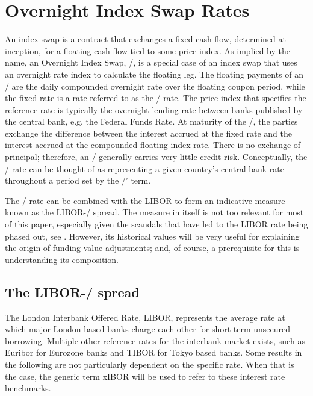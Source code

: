 \documentclass[main.tex]{subfiles}
\begin{document}
    \section{Overnight Index Swap Rates}
    
    An index swap is a contract that exchanges a fixed cash flow, determined at inception,
    for a floating cash flow tied to some price index.
    As implied by the name, an Overnight Index Swap, \OIS/, is a special case of an index swap
    that uses an overnight rate index to calculate the floating leg.
    The floating payments of an \OIS/ are the daily compounded overnight rate 
    over the floating coupon period,
    while the fixed rate is a rate referred to as the \OIS/ rate.
    The price index that specifies the reference rate is typically the overnight 
    lending rate between banks published by the central bank, e.g. the Federal Funds Rate.
    At maturity of the \OIS/, the parties exchange the difference between the interest accrued 
    at the fixed rate and the interest accrued at the compounded floating index rate.
    There is no exchange of principal; 
    therefore, an \OIS/ generally carries very little credit risk. 
    Conceptually, the \OIS/ rate can be thought of as representing a given country's
    central bank rate throughout a period set by the \OIS/' term. 

    The \OIS/ rate can be combined with the LIBOR to form an indicative measure
    known as the LIBOR-\OIS/ spread.
    The measure in itself is not too relevant for most of this paper,
    especially given the scandals that have led to the LIBOR rate being phased out,
    see \textcite{ForbesLibor}.
    However, its historical values will be very useful 
    for explaining the origin of funding value adjustments;
    and, of course, a prerequisite for this is understanding its composition.

    \subsection{The LIBOR-\OIS/ spread}

    The London Interbank Offered Rate, LIBOR, represents the average rate 
    at which major London based banks charge each other for short-term unsecured borrowing.
    Multiple other reference rates for the interbank market exists, 
    such as Euribor for Eurozone banks and TIBOR for Tokyo based banks.
    Some results in the following are not particularly dependent on the specific rate.
    When that is the case, the generic term xIBOR will be used 
    to refer to these interest rate benchmarks.
\end{document}
